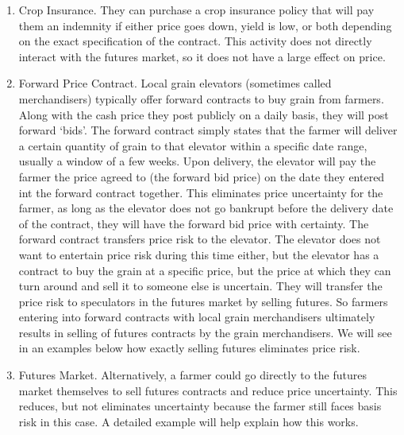 \documentclass[
]{book}
\begin{document}
\begin{enumerate}
\def\labelenumi{\arabic{enumi}.}
\item
  Crop Insurance. They can purchase a crop insurance policy that will pay them an indemnity if either price goes down, yield is low, or both depending on the exact specification of the contract. This activity does not directly interact with the futures market, so it does not have a large effect on price.
\item
  Forward Price Contract. Local grain elevators (sometimes called merchandisers) typically offer forward contracts to buy grain from farmers. Along with the cash price they post publicly on a daily basis, they will post forward `bids'. The forward contract simply states that the farmer will deliver a certain quantity of grain to that elevator within a specific date range, usually a window of a few weeks. Upon delivery, the elevator will pay the farmer the price agreed to (the forward bid price) on the date they entered int the forward contract together. This eliminates price uncertainty for the farmer, as long as the elevator does not go bankrupt before the delivery date of the contract, they will have the forward bid price with certainty. The forward contract transfers price risk to the elevator. The elevator does not want to entertain price risk during this time either, but the elevator has a contract to buy the grain at a specific price, but the price at which they can turn around and sell it to someone else is uncertain. They will transfer the price risk to speculators in the futures market by selling futures. So farmers entering into forward contracts with local grain merchandisers ultimately results in selling of futures contracts by the grain merchandisers. We will see in an examples below how exactly selling futures eliminates price risk.
\item
  Futures Market. Alternatively, a farmer could go directly to the futures market themselves to sell futures contracts and reduce price uncertainty. This reduces, but not eliminates uncertainty because the farmer still faces basis risk in this case. A detailed example will help explain how this works.
\end{enumerate}
\end{document}
